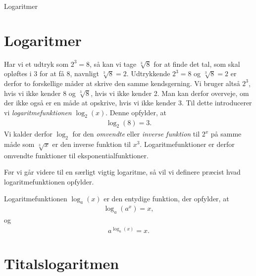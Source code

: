 
\begin{center}
\Huge
Logaritmer
\end{center}

\section*{Logaritmer}

Har vi et udtryk som $2^3 = 8$, så kan vi tage $\sqrt[3]{8}$ for at finde det tal, som skal opløftes i $3$ for at få $8$, navnligt $\sqrt[3]{8} = 2$. Udtrykkende $2^3 = 8$ og $\sqrt[3]{8} = 2$ er derfor to forskellige måder at skrive den samme kendsgerning. Vi bruger altså $2^3$, hvis vi ikke kender $8$ og $\sqrt[3]{8}$, hvis vi ikke kender 2. Man kan derfor overveje, om der ikke også er en måde at opskrive, hvis vi ikke kender 3. Til dette introducerer vi \textit{logaritmefunktionen} $\log_2(x)$. Denne opfylder, at
\begin{align*}
	\log_2(8) = 3. 
\end{align*}
Vi kalder derfor $\log_2$ for den \textit{omvendte} eller \textit{inverse funktion} til $2^x$ på samme måde som $\sqrt[3]{x}$ er den inverse funktion til $x^3$. Logaritmefunktioner er derfor omvendte funktioner til eksponentialfunktioner. 

Før vi går videre til en særligt vigtig logaritme, så vil vi definere præcist hvad logaritmefunktionen opfylder.
\begin{defn}[Logaritmefunktionen]
	Logaritmefunktionen $\log_a(x)$ er den entydige funktion, der opfylder, at 
	\begin{align*}
		\log_a(a^x) = x,
	\end{align*}
	og
	\begin{align*}
		a^{\log_a(x)} = x.
	\end{align*}
\end{defn}
\section*{Titalslogaritmen}

